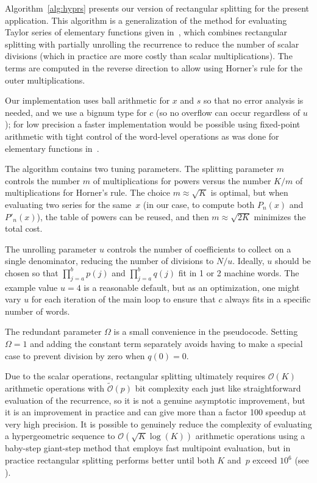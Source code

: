 \documentclass{siamart0216}
\newcommand{\OO}{\mathcal{O}}
\newcommand{\OOtilde}{\widetilde{\mathcal{O}}}
\begin{document}
Algorithm \ref{alg:hyprs} presents our version of rectangular splitting
for the present application.
This algorithm is a generalization of the
method for evaluating Taylor series of elementary
functions given in~\cite{Johansson2015elementary},
which combines rectangular splitting
with partially unrolling the recurrence to reduce the number of scalar divisions
(which in practice are more costly than scalar multiplications).
The terms are computed in the reverse direction to allow
using Horner's rule for the outer
multiplications.

Our implementation uses ball arithmetic for $x$ and $s$
so that no error analysis is needed, and we use a bignum type for $c$ (so
no overflow can occur regardless of $u$);
for low precision a faster implementation
would be possible using fixed-point arithmetic with tight
control of the word-level operations
as was done for elementary functions in~\cite{Johansson2015elementary}.

The algorithm contains two tuning parameters.
The splitting parameter $m$ controls the
number $m$ of multiplications for powers versus the number $K / m$ of
multiplications for Horner's rule.
The choice $m \approx \sqrt K$ is optimal,
but when evaluating two series for the same~$x$
(in our case, to compute both $P_n(x)$ and $P'_n(x)$),
the table of powers can be reused,
and then $m \approx \sqrt{2K}$ minimizes the total cost.

The unrolling parameter $u$ controls the number of coefficients
to collect on a single denominator, reducing the
number of divisions to $N / u$.
Ideally, $u$ should be chosen
so that $\prod_{j=a}^b p(j)$
and $\prod_{j=a}^b q(j)$ fit in 1 or 2 machine words.
The example value $u = 4$ is a reasonable
default, but as an optimization, one might vary $u$
for each iteration of the main loop
to ensure that $c$ always fits in a specific number of words.

The redundant parameter $\Omega$ is a small convenience in the pseudocode.
Setting $\Omega = 1$ and adding the constant term separately
avoids having to make a special case to prevent division by zero
when $q(0) = 0$.

Due to the scalar operations, rectangular splitting ultimately
requires $\OO(K)$ arithmetic operations with $\OOtilde(p)$ bit complexity
each
just like straightforward evaluation of the recurrence, so it is
not a genuine asymptotic improvement, but
it is an improvement in practice and
can give more than a factor 100 speedup at very high precision.
It is possible to genuinely reduce the complexity of evaluating
a hypergeometric sequence to $\OO(\sqrt{K} \log(K))$ arithmetic
operations using a baby-step giant-step method
that employs fast multipoint evaluation,
but in practice rectangular splitting
performs better until both $K$ and~$p$
exceed $10^6$ (see \cite{Johansson2014rectangular}).
\end{document}
